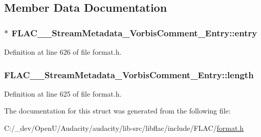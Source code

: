 \subsection{Member Data Documentation}
\subsubsection[{\texorpdfstring{entry}{entry}}]{$\ast$ F\+L\+A\+C\+\_\+\+\_\+\+Stream\+Metadata\+\_\+\+Vorbis\+Comment\+\_\+\+Entry\+::entry}\hypertarget{struct_f_l_a_c_____stream_metadata___vorbis_comment___entry_a78944f78822b92e7a4e5f15f118f6132}{}\label{struct_f_l_a_c_____stream_metadata___vorbis_comment___entry_a78944f78822b92e7a4e5f15f118f6132}


Definition at line 626 of file format.\+h.

\subsubsection[{\texorpdfstring{length}{length}}]{ F\+L\+A\+C\+\_\+\+\_\+\+Stream\+Metadata\+\_\+\+Vorbis\+Comment\+\_\+\+Entry\+::length}\hypertarget{struct_f_l_a_c_____stream_metadata___vorbis_comment___entry_aa375f16819aaa4f7e08d8009167cb19e}{}\label{struct_f_l_a_c_____stream_metadata___vorbis_comment___entry_aa375f16819aaa4f7e08d8009167cb19e}


Definition at line 625 of file format.\+h.



The documentation for this struct was generated from the following file\+:\begin{DoxyCompactItemize}
\item 
C\+:/\+\_\+dev/\+Open\+U/\+Audacity/audacity/lib-\/src/libflac/include/\+F\+L\+A\+C/\hyperlink{include_2_f_l_a_c_2format_8h}{format.\+h}\end{DoxyCompactItemize}
